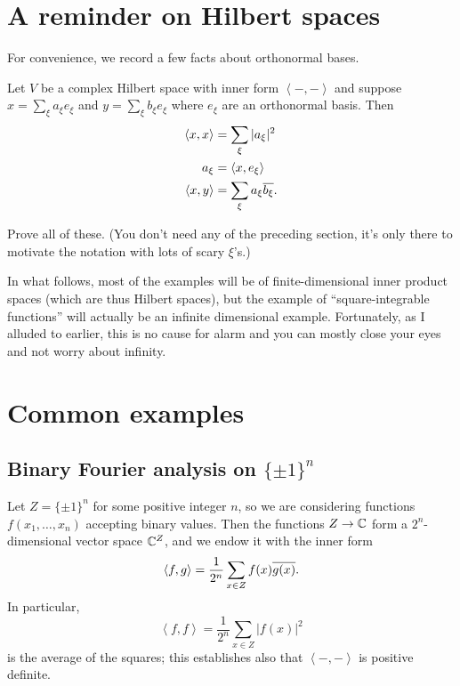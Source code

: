 \section{A reminder on Hilbert spaces}
For convenience, we record a few facts about orthonormal bases.
\begin{proposition}
	\label{prop:orthonormal}
	Let $V$ be a complex Hilbert space
	with inner form $\left< -,-\right>$
	and suppose $x = \sum_\xi a_\xi e_\xi$ and $y = \sum_\xi b_\xi e_\xi$
	where $e_\xi$ are an orthonormal basis.
	Then
	\begin{align*}
		\left< x,x \right> &= \sum_\xi |a_\xi|^2 \\
		a_\xi &= \left< x, e_\xi \right> \\
		\left< x,y \right> &= \sum_\xi a_\xi \overline{b_\xi}.
	\end{align*}
\end{proposition}
\begin{exercise}
	Prove all of these.
	(You don't need any of the preceding section,
	it's only there to motivate the notation with lots of scary $\xi$'s.)
\end{exercise}

In what follows,
most of the examples will be of finite-dimensional inner product spaces
(which are thus Hilbert spaces),
but the example of ``square-integrable functions''
will actually be an infinite dimensional example.
Fortunately, as I alluded to earlier,
this is no cause for alarm
and you can mostly close your eyes and not worry about infinity.

\section{Common examples}
\subsection{Binary Fourier analysis on $\{\pm1\}^n$}
Let $Z = \{\pm 1\}^n$ for some positive integer $n$,
so we are considering functions $f(x_1, \dots, x_n)$ accepting binary values.
Then the functions $Z \to \mathbb C$ form a $2^n$-dimensional vector space $\mathbb C^Z$,
and we endow it with the inner form
\[ \left< f,g \right> = \frac{1}{2^n} \sum_{x \in Z} f(x) \overline{g(x)}. \]
In particular,
\[ \left< f,f \right>
	= \frac{1}{2^n} \sum_{x \in Z} \left\lvert f(x) \right\rvert^2 \]
is the average of the squares;
this establishes also that $\left< -,-\right>$ is positive definite.


